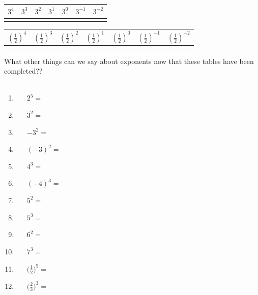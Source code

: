 \documentclass[a4paper,12pt]{article}
\begin{document}
\begin{center}
	\begin{tabular}{| >{\centering\arraybackslash}m{\len} | >{\centering\arraybackslash}m{\len}  | >{\centering\arraybackslash}m{\len} | >{\centering\arraybackslash}m{\len} |>{\centering\arraybackslash}m{\len} |>{\centering\arraybackslash}m{\len} |>{\centering\arraybackslash}m{\len} |}\hline
		$3^{4}$ & $3^{3}$ & $3^{2}$&$3^{1}$& $3^{0}$ & $3^{-1}$&$3^{-2}$\\\hline
		&&&&&&\\\hline\end{tabular}
\end{center}

\begin{center}
	\begin{tabular}{| >{\centering\arraybackslash}m{\len} | >{\centering\arraybackslash}m{\len}  | >{\centering\arraybackslash}m{\len} | >{\centering\arraybackslash}m{\len} |>{\centering\arraybackslash}m{\len} |>{\centering\arraybackslash}m{\len} |>{\centering\arraybackslash}m{\len} |}\hline
		$(\frac{1}{2})^{4}$ & $(\frac{1}{2})^{3}$ & $(\frac{1}{2})^{2}$&$(\frac{1}{2})^{1}$& $(\frac{1}{2})^{0}$ & $(\frac{1}{2})^{-1}$&$(\frac{1}{2})^{-2}$\\\hline
		&&&&&&\\\hline\end{tabular}
\end{center}
What other things can we say about exponents now that these tables have been completed??\\\\
\begin{tcolorbox}[colback=red!0!white, colframe=gray ,title=\subsubsection{Work out the following exponents.}\label{exp1}]
	\begin{multicols}{3}
		\begin{enumerate}[label=\footnotesize \roman*)]
			\item~~~$\displaystyle 2^5=$
			\item~~~$\displaystyle 3^2=$
			\item~~~$\displaystyle -3^2=$
			\item~~~$\displaystyle (-3)^2=$
			\item~~~$\displaystyle 4^3=$
			\item~~~$\displaystyle (-4)^3=$
			\item~~~$\displaystyle 5^2=$
			\item~~~$\displaystyle 5^3=$
			\item~~~$\displaystyle 6^2=$
			\item~~~$\displaystyle 7^3=$
			\item~~~$\displaystyle \Big(\frac{1}{2}\Big)^{5}=$
			\item~~~$\displaystyle \Big(\frac{2}{3}\Big)^{3}=$
		\end{enumerate}
	\end{multicols}
\end{tcolorbox}\vspace{0.75cm}
\end{document}
